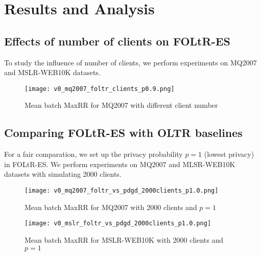 \section{Results and Analysis}


\subsection{Effects of number of clients on FOLtR-ES}

To study the influence of number of clients, we perform experiments on MQ2007 and MSLR-WEB10K datasets. 

\begin{figure}[H]
	\centering
	\texttt{[image: v0\_mq2007\_foltr\_clients\_p0.9.png]}
	\caption{Mean batch MaxRR for MQ2007 with different client number}
	\label{fig: mq2007clients}
\end{figure}


\subsection{Comparing FOLtR-ES with OLTR baselines}

For a fair comparation, we set up the privacy probability $p = 1$ (lowest privacy) in FOLtR-ES. We perform experiments on MQ2007 and MLSR-WEB10K datasets with simulating 2000 clients.

\begin{figure}[H]
	\centering
	\texttt{[image: v0\_mq2007\_foltr\_vs\_pdgd\_2000clients\_p1.0.png]}
	\caption{Mean batch MaxRR for MQ2007 with 2000 clients and $p = 1$}
	\label{fig: mq2007-v0}
\end{figure}

\begin{figure}[H]
	\centering
	\texttt{[image: v0\_mslr\_foltr\_vs\_pdgd\_2000clients\_p1.0.png]}
	\caption{Mean batch MaxRR for MSLR-WEB10K with 2000 clients and $p = 1$}
	\label{fig: mslr-v0}
\end{figure}

